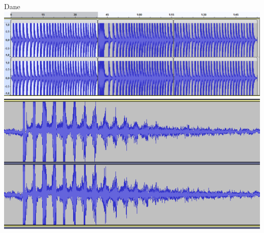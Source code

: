 \documentclass{beamer}
\begin{document}
\begin{frame}{Dane}
	\centering
	\includegraphics[width=\linewidth]{Data.png} \pause
	\includegraphics[width=0.7\linewidth]{Przechwycenie obrazu ekranu_2024-05-04_14-41-05.png}
\end{frame}
\end{document}
